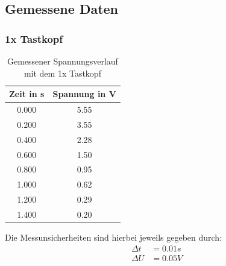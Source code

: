 \documentclass{report}
\begin{document}
\subsection{Gemessene Daten}
\subsubsection{1x Tastkopf}
\begin{table}[H]
    \centering
    \label{tab:1xTK}
    \begin{tabular}{c | c}
        Zeit in \si{s} & Spannung in \si{V} \\
        \hline
        0.000 & 5.55 \\
        0.200 & 3.55 \\
        0.400 & 2.28 \\
        0.600 & 1.50 \\
        0.800 & 0.95 \\
        1.000 & 0.62 \\
        1.200 & 0.29 \\
        1.400 & 0.20
    \end{tabular}
    \caption{Gemessener Spannungsverlauf mit dem 1x Tastkopf}
\end{table}
Die Messunsicherheiten sind hierbei jeweils gegeben durch:
\begin{equation}
    \begin{split}
        \Delta t &= 0.01s \\
        \Delta U &= 0.05V
    \end{split}
    \nonumber
\end{equation}
\end{document}
